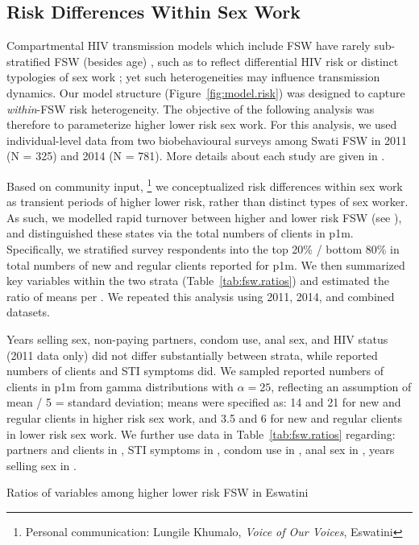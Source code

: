 \subsection{Risk Differences Within Sex Work}\label{mod.par.fsw}
Compartmental HIV transmission models which include FSW
have rarely sub-stratified FSW (besides age) \cite{Knight2022sr,Cremin2017,Low2015,Shannon2015},
such as to reflect differential HIV risk or distinct typologies of sex work
\cite{Blanchard2008,Scorgie2012};
yet such heterogeneities may influence transmission dynamics.
Our model structure (Figure~\ref{fig:model.risk})
was designed to capture \emph{within}-FSW risk heterogeneity.
The objective of the following analysis was therefore to parameterize higher \vs lower risk sex work.
For this analysis, we used individual-level data from
two biobehavioural surveys among Swati FSW in
2011 \cite{Baral2014,Yam2013cond} (N = 325) and 2014 \cite{EswKP2014} (N = 781).
More details about each study are given in .
\par
Based on community input,%
\footnote{Personal communication: Lungile Khumalo, \emph{Voice of Our Voices}, Eswatini}
we conceptualized risk differences within sex work as transient periods of higher \vs lower risk,
rather than distinct types of sex worker.
As such, we modelled rapid turnover between higher and lower risk FSW (see ),
and distinguished these states via the total numbers of clients in p1m.
Specifically, we stratified survey respondents into the top 20\% / bottom 80\%
in total numbers of new and regular clients reported for p1m.
We then summarized key variables within the two strata (Table~\ref{tab:fsw.ratios})
and estimated the ratio of means per \cite{Hauschke1999}.
We repeated this analysis using 2011, 2014, and combined datasets.
\par
Years selling sex, non-paying partners, condom use, anal sex, and HIV status (2011 data only)
did not differ substantially between strata,
while reported numbers of clients and STI symptoms did.
We sampled reported numbers of clients in p1m from gamma distributions with $\alpha = 25$,
reflecting an assumption of mean / 5 = standard deviation;
means were specified as:
14 and 21 for new and regular clients in higher risk sex work, and
3.5 and 6 for new and regular clients in lower risk sex work.
We further use data in Table~\ref{tab:fsw.ratios} regarding:
partners and clients in ,
STI symptoms in ,
condom use in ,
anal sex in ,
years selling sex in .
\begin{table}
  \centering
  \caption{Ratios of variables among higher \vs lower risk FSW in Eswatini}
  \label{tab:fsw.ratios}
  
\end{table}

